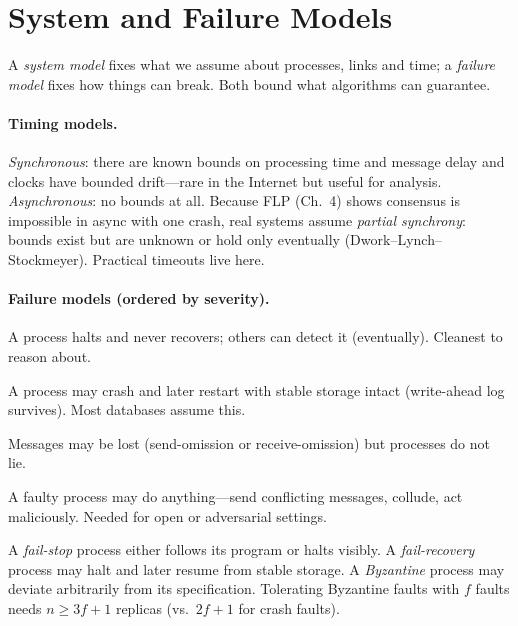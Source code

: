 \section{System and Failure Models}
\label{sec:models}
A \emph{system model} fixes what we assume about processes, links and time; a \emph{failure model} fixes how things can break. Both bound what algorithms can guarantee.

\paragraph{Timing models.} \emph{Synchronous}: there are known bounds on processing time and message delay and clocks have bounded drift---rare in the Internet but useful for analysis. \emph{Asynchronous}: no bounds at all. Because FLP (Ch.~4) shows consensus is impossible in async with one crash, real systems assume \emph{partial synchrony}: bounds exist but are unknown or hold only eventually (Dwork--Lynch--Stockmeyer). Practical timeouts live here.

\paragraph{Failure models (ordered by severity).}
\begin{description}[leftmargin=1.2em,style=nextline]
    \item[Crash-stop (fail-stop)] A process halts and never recovers; others can detect it (eventually). Cleanest to reason about.
    \item[Crash-recovery] A process may crash and later restart with stable storage intact (write-ahead log survives). Most databases assume this.
    \item[Omission] Messages may be lost (send-omission or receive-omission) but processes do not lie.
    \item[Byzantine (arbitrary)] A faulty process may do anything---send conflicting messages, collude, act maliciously. Needed for open or adversarial settings.
\end{description}

\begin{definition}
A \emph{fail-stop} process either follows its program or halts visibly. A \emph{fail-recovery} process may halt and later resume from stable storage. A \emph{Byzantine} process may deviate arbitrarily from its specification. Tolerating Byzantine faults with $f$ faults needs $n \ge 3f+1$ replicas (vs.\ $2f+1$ for crash faults).
\end{definition}

